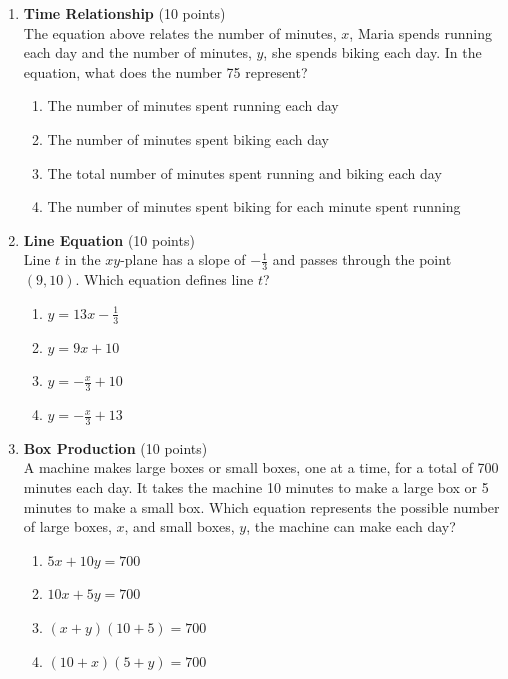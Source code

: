 \begin{enumerate}
  \item \textbf{Time Relationship} (10 points)\\
  The equation above relates the number of minutes, $x$, Maria spends running each day and the number of minutes, $y$, she spends biking each day. In the equation, what does the number 75 represent?\\
  \begin{enumerate}[label=(\Alph*)]
    \item The number of minutes spent running each day
    \item The number of minutes spent biking each day
    \item The total number of minutes spent running and biking each day
    \item The number of minutes spent biking for each minute spent running
  \end{enumerate}
  \begin{subanswer}
  \end{subanswer}

  \newpage

  \item \textbf{Line Equation} (10 points)\\
  Line $t$ in the $xy$-plane has a slope of $-\frac{1}{3}$ and passes through the point $(9,10)$. Which equation defines line $t$?\\
  \begin{enumerate}[label=(\Alph*)]
    \item $y=13x-\frac{1}{3}$
    \item $y=9x+10$
    \item $y=-\frac{x}{3}+10$
    \item $y=-\frac{x}{3}+13$
  \end{enumerate}
  \begin{subanswer}
  \end{subanswer}

  \item \textbf{Box Production} (10 points)\\
  A machine makes large boxes or small boxes, one at a time, for a total of 700 minutes each day. It takes the machine 10 minutes to make a large box or 5 minutes to make a small box. Which equation represents the possible number of large boxes, $x$, and small boxes, $y$, the machine can make each day?\\
  \begin{enumerate}[label=(\Alph*)]
    \item $5x+10y=700$
    \item $10x+5y=700$
    \item $(x+y)(10+5)=700$
    \item $(10+x)(5+y)=700$
  \end{enumerate}
  \begin{subanswer}
  \end{subanswer}


\end{enumerate}
